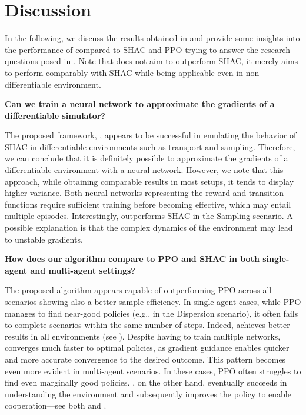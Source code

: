 \section{Discussion}
In the following, we discuss the results obtained in  and provide some insights into the performance of \fname{} compared to SHAC and PPO trying to answer the research questions posed in . Note that \fname{} does not aim to outperform SHAC, it merely aims to perform comparably with SHAC while being applicable even in non-differentiable environment. 
\begin{center}
 \textbf{Can we train a neural network to approximate the gradients of a differentiable simulator?}
\end{center}

The proposed framework, \fname{}, appears to be successful in emulating the behavior of SHAC in differentiable environments such as transport and sampling. Therefore, we can conclude that it is definitely possible to approximate the gradients of a differentiable environment with a neural network. However, we note that this approach, while obtaining comparable results in most setups, it tends to display higher variance. Both neural networks representing the reward and transition functions require sufficient training before becoming effective, which may entail multiple episodes. Interestingly, \fname{} outperforms SHAC in the Sampling scenario. A possible explanation is that the complex dynamics of the environment may lead to unstable gradients.

\begin{center}
 \textbf{How does our algorithm compare to PPO and SHAC in both single-agent and multi-agent settings?}
\end{center}
The proposed algorithm appears capable of outperforming PPO across all scenarios showing also a better sample efficiency. In single-agent cases, while PPO manages to find near-good policies (e.g., in the Dispersion scenario), it often fails to complete scenarios within the same number of steps. Indeed, \fname{} achieves better results in all environments (see ). Despite having to train multiple networks, \fname{} converges much faster to optimal policies, as gradient guidance enables quicker and more accurate convergence to the desired outcome. This pattern becomes even more evident in multi-agent scenarios. In these cases, PPO often struggles to find even marginally good policies. \fname{}, on the other hand, eventually succeeds in understanding the environment and subsequently improves the policy to enable cooperation---see both  and .

